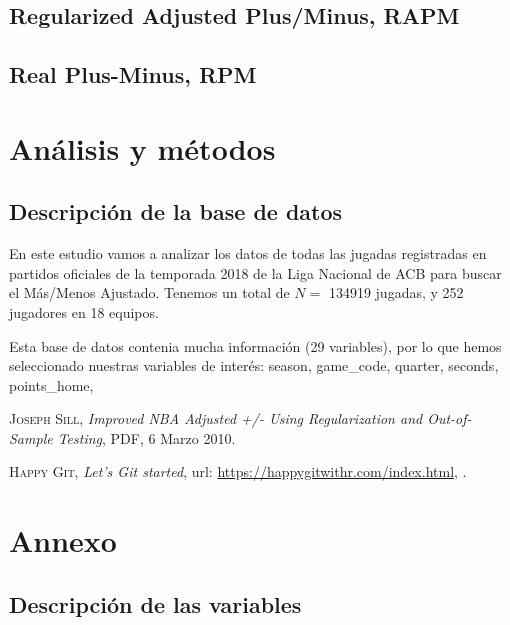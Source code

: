 \documentclass[paper=a4, fontsize=9pt]{article}
\begin{document}
\subsection{Regularized Adjusted Plus/Minus, RAPM}

\subsection{Real Plus-Minus, RPM}

\clearpage



\section{Análisis y métodos}

\subsection{Descripción de la base de datos}

En este estudio vamos a analizar los datos de todas las jugadas registradas en partidos oficiales de la temporada 2018 de la Liga Nacional de ACB para buscar el Más/Menos Ajustado. Tenemos un total de $N=$ 134919 jugadas, y 252 jugadores en 18 equipos.

Esta base de datos contenia mucha información (29 variables), por lo que hemos seleccionado nuestras variables de interés: season, game_code, quarter, seconds, points_home, 







\begin{thebibliography}{X}
	 \textsc{Joseph Sill}, \textit{Improved NBA Adjusted +/- Using Regularization and Out-of-Sample Testing}, PDF, 6 Marzo 2010.
	
	 \textsc{Happy Git}, \textit{Let’s Git started}, url: \url{https://happygitwithr.com/index.html}, .
\end{thebibliography}

\clearpage

\section{Annexo}

\subsection{Descripción de las variables} \label{sec:Annexo1}
\end{document}
